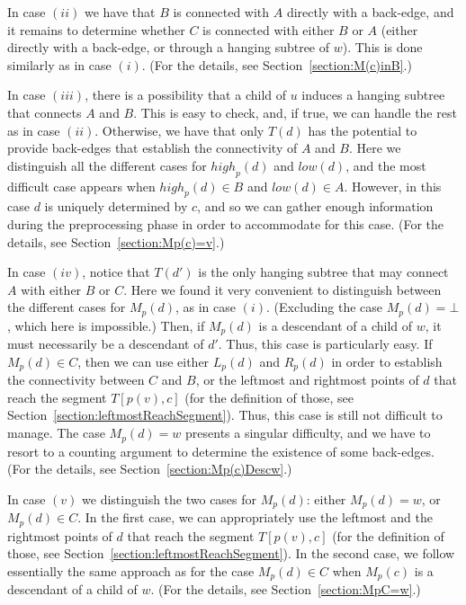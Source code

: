 \documentclass[11pt,a4paper]{article}
\begin{document}
In case $(ii)$ we have that $B$ is connected with $A$ directly with a back-edge, and it remains to determine whether $C$ is connected with either $B$ or $A$ (either directly with a back-edge, or through a hanging subtree of $w$). This is done similarly as in case $(i)$. (For the details, see Section~\ref{section:M(c)inB}.)

In case $(iii)$, there is a possibility that a child of $u$ induces a hanging subtree that connects $A$ and $B$. This is easy to check, and, if true, we can handle the rest as in case $(ii)$. Otherwise, we have that only $T(d)$ has the potential to provide back-edges that establish the connectivity of $A$ and $B$. Here we distinguish all the different cases for $\mathit{high}_p(d)$ and $\mathit{low}(d)$, and the most difficult case appears when $\mathit{high}_p(d)\in B$ and $\mathit{low}(d)\in A$. However, in this case $d$ is uniquely determined by $c$, and so we can gather enough information during the preprocessing phase in order to accommodate for this case. (For the details, see Section~\ref{section:Mp(c)=v}.)



In case $(iv)$, notice that $T(d')$ is the only hanging subtree that may connect $A$ with either $B$ or $C$. Here we found it very convenient to distinguish between the different cases for $M_p(d)$, as in case $(i)$. (Excluding the case $M_p(d)=\bot$, which here is impossible.) Then, if $M_p(d)$ is a descendant of a child of $w$, it must necessarily be a descendant of $d'$. Thus, this case is particularly easy. If $M_p(d)\in C$, then we can use either $L_p(d)$ and $R_p(d)$ in order to establish the connectivity between $C$ and $B$, or the leftmost and rightmost points of $d$ that reach the segment $T[p(v),c]$ (for the definition of those, see Section~\ref{section:leftmostReachSegment}). Thus, this case is still not difficult to manage. The case $M_p(d)=w$ presents a singular difficulty, and we have to resort to a counting argument to determine the existence of some back-edges. (For the details, see Section~\ref{section:Mp(c)Descw}.)



In case $(v)$ we distinguish the two cases for $M_p(d)$: either $M_p(d)=w$, or $M_p(d)\in C$. In the first case, we can appropriately use the leftmost and the rightmost points of $d$ that reach the segment $T[p(v),c]$ (for the definition of those, see Section~\ref{section:leftmostReachSegment}). In the second case, we follow essentially the same approach as for the case $M_p(d)\in C$ when $M_p(c)$ is a descendant of a child of $w$. (For the details, see Section~\ref{section:MpC=w}.)
\end{document}
